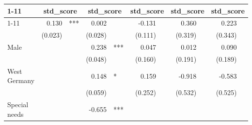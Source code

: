 \documentclass{article}
\begin{document}
\begin{table}[!h]
\centering
\begin{tabular}{lllllllllll}
\cline{1-11}
\multicolumn{1}{r}{} &
  \multicolumn{2}{c}{std\_score} &
  \multicolumn{2}{c}{std\_score} &
  \multicolumn{2}{c}{std\_score} &
  \multicolumn{2}{c}{std\_score} &
  \multicolumn{2}{c}{std\_score} \\
\cline{1-11}
\multicolumn{1}{l}{Class size} &
  \multicolumn{1}{r}{0.130} &
  \multicolumn{1}{l}{***} &
  \multicolumn{1}{r}{0.002} &
  \multicolumn{1}{l}{} &
  \multicolumn{1}{r}{-0.131} &
  \multicolumn{1}{l}{} &
  \multicolumn{1}{r}{0.360} &
  \multicolumn{1}{l}{} &
  \multicolumn{1}{r}{0.223} &
  \multicolumn{1}{l}{} \\
\multicolumn{1}{l}{} &
  \multicolumn{1}{r}{(0.023)} &
  \multicolumn{1}{l}{} &
  \multicolumn{1}{r}{(0.028)} &
  \multicolumn{1}{l}{} &
  \multicolumn{1}{r}{(0.111)} &
  \multicolumn{1}{l}{} &
  \multicolumn{1}{r}{(0.319)} &
  \multicolumn{1}{l}{} &
  \multicolumn{1}{r}{(0.343)} &
  \multicolumn{1}{l}{} \\
\multicolumn{1}{l}{Male} &
  \multicolumn{1}{r}{} &
  \multicolumn{1}{l}{} &
  \multicolumn{1}{r}{0.238} &
  \multicolumn{1}{l}{***} &
  \multicolumn{1}{r}{0.047} &
  \multicolumn{1}{l}{} &
  \multicolumn{1}{r}{0.012} &
  \multicolumn{1}{l}{} &
  \multicolumn{1}{r}{0.090} &
  \multicolumn{1}{l}{} \\
\multicolumn{1}{l}{} &
  \multicolumn{1}{r}{} &
  \multicolumn{1}{l}{} &
  \multicolumn{1}{r}{(0.048)} &
  \multicolumn{1}{l}{} &
  \multicolumn{1}{r}{(0.160)} &
  \multicolumn{1}{l}{} &
  \multicolumn{1}{r}{(0.191)} &
  \multicolumn{1}{l}{} &
  \multicolumn{1}{r}{(0.189)} &
  \multicolumn{1}{l}{} \\
\multicolumn{1}{l}{West Germany} &
  \multicolumn{1}{r}{} &
  \multicolumn{1}{l}{} &
  \multicolumn{1}{r}{0.148} &
  \multicolumn{1}{l}{*} &
  \multicolumn{1}{r}{0.159} &
  \multicolumn{1}{l}{} &
  \multicolumn{1}{r}{-0.918} &
  \multicolumn{1}{l}{} &
  \multicolumn{1}{r}{-0.583} &
  \multicolumn{1}{l}{} \\
\multicolumn{1}{l}{} &
  \multicolumn{1}{r}{} &
  \multicolumn{1}{l}{} &
  \multicolumn{1}{r}{(0.059)} &
  \multicolumn{1}{l}{} &
  \multicolumn{1}{r}{(0.252)} &
  \multicolumn{1}{l}{} &
  \multicolumn{1}{r}{(0.532)} &
  \multicolumn{1}{l}{} &
  \multicolumn{1}{r}{(0.525)} &
  \multicolumn{1}{l}{} \\
\multicolumn{1}{l}{Special needs} &
  \multicolumn{1}{r}{} &
  \multicolumn{1}{l}{} &
  \multicolumn{1}{r}{-0.655} &
  \multicolumn{1}{l}{***} &

\end{tabular}
\end{table}
\end{document}

